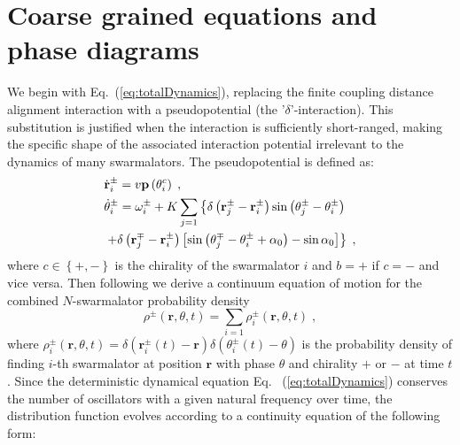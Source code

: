 \documentclass{article}
\begin{document}
\color{black}

\section{\label{sec:analysis}Coarse grained equations and phase diagrams}

We begin with Eq.~(\ref{eq:totalDynamics}), replacing the finite coupling distance alignment interaction with a pseudopotential (the '$\delta$'-interaction). This substitution is justified when the interaction is sufficiently short-ranged, making the specific shape of the associated interaction potential irrelevant to the dynamics of many swarmalators. The pseudopotential is defined as:
\begin{subequations}
    \begin{align}
        &\dot{\mathbf{r}}_{i}^{\pm}=v\mathbf{p}\left( \theta _{i}^{c} \right) \;,\\
        &\dot{\theta}_{i}^{\pm}=\omega _{i}^{\pm}+K\sum_{j=1}{\left\{ \delta \left( \mathbf{r}_{j}^{\pm}-\mathbf{r}_{i}^{\pm} \right) \sin \left( \theta _{j}^{\pm}-\theta _{i}^{\pm} \right) \right.}\notag\\
        &\left. +\delta \left( \mathbf{r}_{j}^{\mp}-\mathbf{r}_{i}^{\pm} \right) \left[ \sin \left( \theta _{j}^{\mp}-\theta _{i}^{\pm}+\alpha _0 \right) -\sin \alpha _0 \right] \right\} \;,
    \end{align}
\end{subequations}
where $c\in\left\{+,-\right\}$ is the chirality of the swarmalator $i$ and $b=+$ if $c=-$ and vice versa.  
Then following \cite{David_S_Dean_1996} we derive a continuum equation of motion for the combined $N$-swarmalator probability density
\begin{equation}
    \label{eq:globalContinuityDef}
    \rho ^{\pm}\left( \mathbf{r},\theta ,t \right) =\sum_{i=1}{\rho _{i}^{\pm}\left( \mathbf{r},\theta ,t \right)}\;,
\end{equation}
where $\rho _{i}^{\pm}\left( \mathbf{r},\theta ,t \right) =\delta \left( \mathbf{r}_{i}^{\pm}\left( t \right) -\mathbf{r} \right) \delta \left( \theta _{i}^{\pm}\left( t \right) -\theta \right)$ is the probability density of finding $i$-th swarmalator at position $\mathbf{r}$ with phase $\theta$ and chirality $+$ or $-$ at time $t$.
Since the deterministic dynamical equation Eq.~ (\ref{eq:totalDynamics}) conserves the number of oscillators with a given natural frequency over time, the distribution function evolves according to a continuity equation of the following form:
\end{document}
